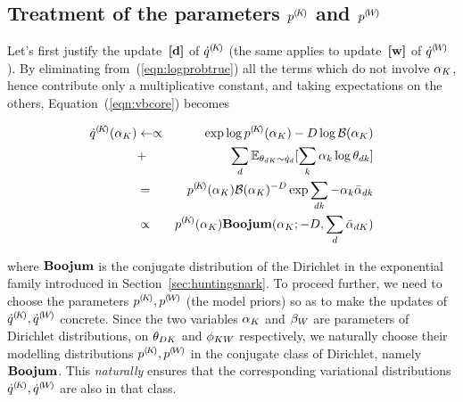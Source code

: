 \subsection{Treatment of the parameters ${p}^{(\!{K}\!)}$ and ${p}^{(\!{W}\!)}$}
Let's first justify the update~$\textbf{[d]}$ of ${\dot{q}}^{(\!{K}\!)}$ (the same applies to update~$\textbf{[w]}$ of ${\dot{q}}^{(\!{W}\!)}$). By eliminating from~(\ref{eqn:logprobtrue}) all the terms which do not involve $\alpha_K$, hence contribute only a multiplicative constant, and taking expectations on the others, Equation~(\ref{eqn:vbcore}) becomes
\begin{small}
\begin{eqnarray*}
\cpnt{\dot{q}}{K}(\vmK_K)
& \assignn\propto &
\exp\log\cpnt{p}{K}(\vmK_K)-D\log\mathcal{B}(\vmK_K)\\
& + & \sum_d\expectation_{\vmDK_{dK}\sim\dot{q}_d}[\sum_k\vmK_k\log\vmDK_{dk}]\\
& = &
\cpnt{p}{K}(\vmK_K)\mathcal{B}(\vmK_K)^{-D}\exp\sum_{dk}-\vmK_k\vvmbDK_{dk}\\
& \propto &
\cpnt{p}{K}(\vmK_K)\mbeta(\vmK_K;-D,\sum_d\vvmbDK_{dK})
\end{eqnarray*}
\end{small}
where $\mathbf{Boojum}$ is the conjugate distribution of the Dirichlet in the exponential family introduced in Section~\ref{sec:huntingsnark}. To proceed further, we need to choose the parameters ${p}^{(\!{K}\!)},{p}^{(\!{W}\!)}$ (the model priors) so as to make the updates of ${\dot{q}}^{(\!{K}\!)},{\dot{q}}^{(\!{W}\!)}$ concrete. Since the two variables $\alpha_K$ and $\beta_W$ are parameters of Dirichlet distributions, on $\theta_{DK}$ and $\phi_{KW}$ respectively, we naturally choose their modelling distributions ${p}^{(\!{K}\!)},{p}^{(\!{W}\!)}$ in the conjugate class of Dirichlet, namely $\mathbf{Boojum}$. This {\em naturally} ensures that the corresponding variational distributions ${\dot{q}}^{(\!{K}\!)},{\dot{q}}^{(\!{W}\!)}$ are also in that class.

